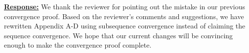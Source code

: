 
\vspace{1eM}
\underline{\textbf{Response:}} We thank the reviewer for pointing out the mistake in our previous convergence proof. Based on the reviewer's comments and suggestions, we have rewritten Appendix A-D using subsequence convergence instead of claiming the sequence convergence. We hope that our current changes will be convincing enough to make the convergence proof complete.


